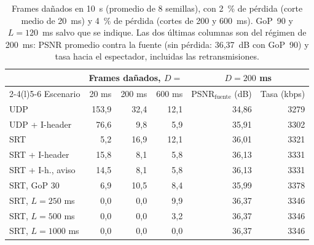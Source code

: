 \begin{table}[t]
\centering
\caption{Frames dañados en 10~s (promedio de 8 semillas), con 2~\% de pérdida (corte medio de 20~ms) y 4~\% de pérdida (cortes de 200 y 600~ms). GoP~90 y $L=120$~ms salvo que se indique. Las dos últimas columnas son del régimen de 200~ms: PSNR promedio contra la fuente (sin pérdida: 36,37~dB con GoP~90) y tasa hacia el espectador, incluidas las retransmisiones.}
\label{tab:res}
\footnotesize
\setlength{\tabcolsep}{3pt}
\begin{tabular}{@{}lrrrrr@{}}
\toprule
 & \multicolumn{3}{c}{Frames dañados, $D=$} & \multicolumn{2}{c}{$D=200$ ms} \\ \cmidrule(lr){2-4}\cmidrule(l){5-6}
Escenario & 20 ms & 200 ms & 600 ms & PSNR$_\mathrm{fuente}$ (dB) & Tasa (kbps) \\
\midrule
UDP & 153,9 & 32,4 & 12,1 & 34,86 & 3279 \\
UDP + I-header & 76,6 & 9,8 & 5,9 & 35,91 & 3302 \\
\addlinespace[2pt]
SRT & 5,2 & 16,9 & 12,1 & 36,01 & 3321 \\
SRT + I-header & 15,8 & 8,1 & 5,8 & 36,13 & 3331 \\
SRT + I-h., aviso & 14,5 & 8,1 & 5,8 & 36,13 & 3331 \\
\addlinespace[2pt]
SRT, GoP 30 & 6,9 & 10,5 & 8,4 & 35,99 & 3378 \\
SRT, $L=250$ ms & 0,0 & 0,0 & 9,9 & 36,37 & 3346 \\
SRT, $L=500$ ms & 0,0 & 0,0 & 3,2 & 36,37 & 3346 \\
SRT, $L=1000$ ms & 0,0 & 0,0 & 0,0 & 36,37 & 3346 \\
\bottomrule
\end{tabular}
\end{table}
